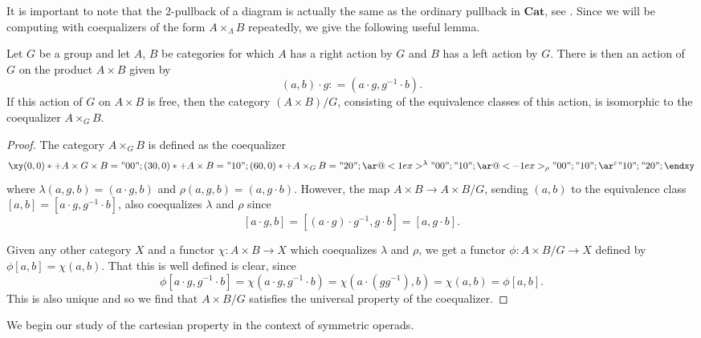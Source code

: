 \documentclass{amsbook} %
\newcommand{\mb}{\mathbf}
\numberwithin{section}{chapter}
\begin{document}
It is important to note that the  $2$-pullback of a diagram is actually the same as the ordinary pullback in $\mb{Cat}$, see \cite{kelly-elem}. Since we will be computing with coequalizers of the form $A \times_{\Lambda} B$ repeatedly, we give the following useful lemma.

\begin{lem}\label{coeq-lem}
Let $G$ be a group and let $A$, $B$ be categories for which $A$ has a right action by $G$ and $B$ has a left action by $G$. There is then an action of $G$ on the product $A \times B$ given by
    \[
        (a,b) \cdot g \colon = (a \cdot g, g^{-1} \cdot b).
    \]
If this action of $G$ on $A \times B$ is free, then the category $(A \times B)/G$, consisting of the equivalence classes of this action, is isomorphic to the coequalizer $A \times_G B$.
\end{lem}
\begin{proof}
The category $A \times_G B$ is defined as the coequalizer
    \[
        \xy
            (0,0)*+{A \times G \times B}="00";
            (30,0)*+{A \times B}="10";
            (60,0)*+{A \times_G B}="20";
            {\ar@<1ex>^{\lambda} "00" ; "10"};
            {\ar@<-1ex>_{\rho} "00" ; "10"};
            {\ar^{\varepsilon} "10" ; "20"};
        \endxy
    \]
where $\lambda(a,g,b) = (a \cdot g, b)$ and $\rho(a,g,b) = (a, g \cdot b)$. However, the map $A \times B \rightarrow A \times B/G$, sending $(a,b)$ to the equivalence class $[a,b] = [a \cdot g, g^{-1} \cdot b]$, also coequalizes $\lambda$ and $\rho$ since
    \[
        [a \cdot g, b] = [(a \cdot g) \cdot g^{-1}, g \cdot b] = [a, g \cdot b].
    \]

Given any other category $X$ and a functor $\chi \colon A \times B \rightarrow X$ which coequalizes $\lambda$ and $\rho$, we get a functor $\phi \colon A \times B/G \rightarrow X$ defined by $\phi[a,b] = \chi(a,b)$. That this is well defined is clear, since
    \[
        \phi[a \cdot g, g^{-1} \cdot b] = \chi(a \cdot g, g^{-1} \cdot b) = \chi(a \cdot (gg^{-1}), b) = \chi(a, b) = \phi[a,b].
    \]
This is also unique and so we find that $A \times B/G$ satisfies the universal property of the coequalizer.
\end{proof}

We begin our study of the cartesian property in the context of symmetric operads.
\end{document}
